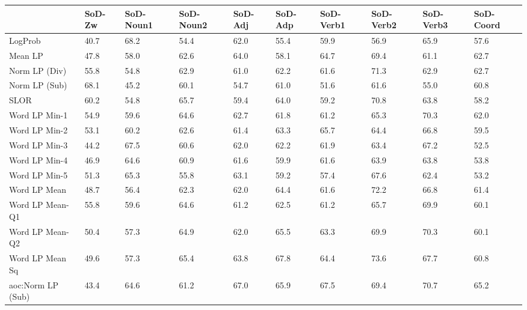 \begin{tabular}{llllllllll}
\toprule
 & SoD-Zw & SoD-Noun1 & SoD-Noun2 & SoD-Adj & SoD-Adp & SoD-Verb1 & SoD-Verb2 & SoD-Verb3 & SoD-Coord \\
\midrule
LogProb & 40.7 & 68.2 & 54.4 & 62.0 & 55.4 & 59.9 & 56.9 & 65.9 & 57.6 \\
Mean LP & 47.8 & 58.0 & 62.6 & 64.0 & 58.1 & 64.7 & 69.4 & 61.1 & 62.7 \\
Norm LP (Div) & 55.8 & 54.8 & 62.9 & 61.0 & 62.2 & 61.6 & 71.3 & 62.9 & 62.7 \\
Norm LP (Sub) & 68.1 & 45.2 & 60.1 & 54.7 & 61.0 & 51.6 & 61.6 & 55.0 & 60.8 \\
SLOR & 60.2 & 54.8 & 65.7 & 59.4 & 64.0 & 59.2 & 70.8 & 63.8 & 58.2 \\
Word LP Min-1 & 54.9 & 59.6 & 64.6 & 62.7 & 61.8 & 61.2 & 65.3 & 70.3 & 62.0 \\
Word LP Min-2 & 53.1 & 60.2 & 62.6 & 61.4 & 63.3 & 65.7 & 64.4 & 66.8 & 59.5 \\
Word LP Min-3 & 44.2 & 67.5 & 60.6 & 62.0 & 62.2 & 61.9 & 63.4 & 67.2 & 52.5 \\
Word LP Min-4 & 46.9 & 64.6 & 60.9 & 61.6 & 59.9 & 61.6 & 63.9 & 63.8 & 53.8 \\
Word LP Min-5 & 51.3 & 65.3 & 55.8 & 63.1 & 59.2 & 57.4 & 67.6 & 62.4 & 53.2 \\
Word LP Mean & 48.7 & 56.4 & 62.3 & 62.0 & 64.4 & 61.6 & 72.2 & 66.8 & 61.4 \\
Word LP Mean-Q1 & 55.8 & 59.6 & 64.6 & 61.2 & 62.5 & 61.2 & 65.7 & 69.9 & 60.1 \\
Word LP Mean-Q2 & 50.4 & 57.3 & 64.9 & 62.0 & 65.5 & 63.3 & 69.9 & 70.3 & 60.1 \\
Word LP Mean Sq & 49.6 & 57.3 & 65.4 & 63.8 & 67.8 & 64.4 & 73.6 & 67.7 & 60.8 \\
aoc:Norm LP (Sub) & 43.4 & 64.6 & 61.2 & 67.0 & 65.9 & 67.5 & 69.4 & 70.7 & 65.2 \\
\bottomrule
\end{tabular}

